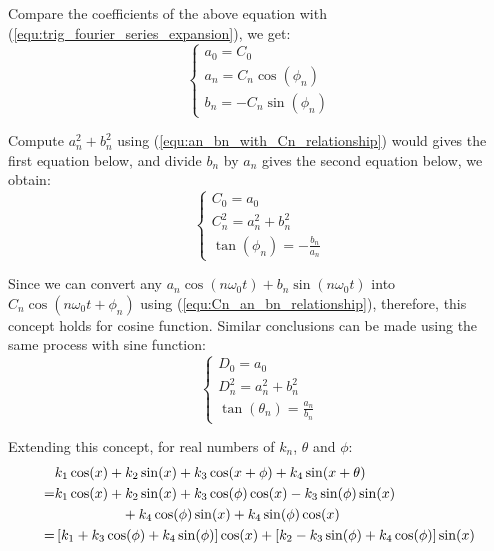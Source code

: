 Compare the coefficients of the above equation with (\ref{equ:trig_fourier_series_expansion}), we get:
\begin{equation}
    \begin{cases}
        a_0     =       C_0                 \\
        a_n     =       C_n\cos(\phi_n)     \\
        b_n     =       -C_n\sin(\phi_n)
    \end{cases}
    \label{equ:an_bn_with_Cn_relationship}
\end{equation}

Compute $a_n^2 + b_n^2$ using ({\ref{equ:an_bn_with_Cn_relationship}}) would gives the first equation below, 
and divide $b_n$ by $a_n$ gives the second equation below, we obtain:
\begin{equation} \begin{cases}
    C_0 = a_0       \\
    C_n^2     =       a_n^2     +       b_n^2       \\
    \tan(\phi_n)   =    -\frac{b_n}{a_n}
    \label{equ:Cn_an_bn_relationship}
\end{cases} \end{equation}

Since we can convert any $a_n\cos(n\omega_0t)+b_n\sin(n\omega_0t)$ into $C_n\cos(n\omega_0t+\phi_n)$ 
using ({\ref{equ:Cn_an_bn_relationship}}), therefore, this concept holds for cosine function. 
Similar conclusions can be made using the same process with sine function:
\begin{equation} \begin{cases}
    D_0 = a_0       \\
    D_n^2     =       a_n^2     +       b_n^2       \\
    \tan(\theta_n)   =    \frac{a_n}{b_n}
    \label{equ:Dn_an_bn_relationship}
\end{cases} \end{equation}

Extending this concept, for real numbers of $k_n$, $\theta$ and $\phi$: 
$$\begin{aligned}
       & k_1\cos(x) + k_2\sin(x) + k_3\cos(x+\phi) + k_4\sin(x+\theta) \\
    =& k_1\cos(x) + k_2\sin(x) + k_3\cos(\phi)\cos(x) - k_3\sin(\phi)\sin(x) \\
    &\hspace{4pc} + k_4\cos(\phi)\sin(x) + k_4\sin(\phi)\cos(x)  \\
    =& \left[k_1 + k_3\cos(\phi) + k_4\sin(\phi)\right] \cos(x) + \left[k_2 - k_3\sin(\phi) + k_4\cos(\phi)\right]\sin(x)   \\
\end{aligned}$$

